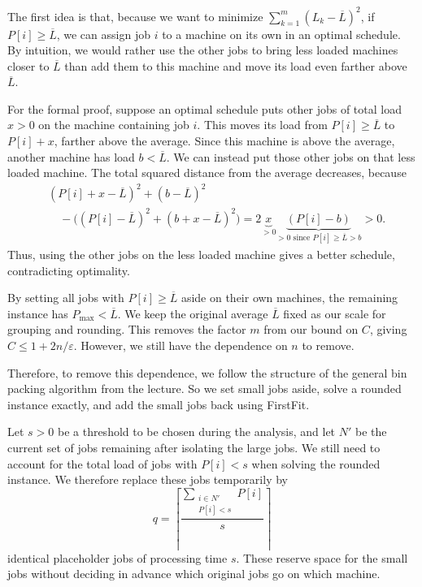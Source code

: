 \documentclass[12pt,a4paper]{article}
\theoremstyle{definition}
\theoremstyle{plain}
\begin{document}
The first idea is that, because we want to minimize
$\sum_{k=1}^{m}(L_k-\overline{L})^2$,
if $P[i]\geq\overline{L}$, we can assign
job $i$ to a machine on its own in an optimal schedule. By intuition, we
would rather use the other jobs to bring less loaded machines closer to
$\overline{L}$ than add them to this machine and move its load even
farther above $\overline{L}$.

For the formal proof, suppose an optimal schedule puts other jobs of
total load $x>0$ on the machine containing job $i$. This moves its load
from $P[i]\geq\overline{L}$ to $P[i]+x$, farther above the average.
Since this machine is above the average, another machine has load
$b<\overline{L}$. We can instead put those other jobs on that less loaded
machine. The total squared distance from the average decreases, because
\[
\begin{aligned}
&(P[i]+x-\overline{L})^2+(b-\overline{L})^2\\
&\quad-\bigl((P[i]-\overline{L})^2+(b+x-\overline{L})^2\bigr)
=2\underbrace{x}_{>0}\underbrace{(P[i]-b)}_{>0\text{ since }P[i]\geq\overline{L}>b}>0.
\end{aligned}
\]
Thus, using the other jobs on the less loaded machine gives a better
schedule, contradicting optimality.

By setting all jobs with $P[i]\geq\overline{L}$ aside on their own machines,
the remaining instance has $P_{\max}<\overline{L}$. We keep the original
average $\overline{L}$ fixed as our scale for grouping and rounding.
This removes the factor $m$ from our bound on
$C$, giving $C\leq1+2n/\varepsilon$. However, we still have the dependence
on $n$ to remove.

Therefore, to remove this dependence, we follow the structure of the
general bin packing algorithm from the lecture. So we set small jobs aside,
solve a rounded instance exactly, and add the small jobs back using
FirstFit.

Let $s>0$ be a threshold to be chosen during the analysis, and let $N'$ be the current set of jobs
remaining after isolating the large jobs. We still need to account for
the total load of jobs with $P[i]<s$ when solving the rounded instance.
We therefore replace these jobs temporarily by
\[
q=\left\lceil\frac{\sum_{\substack{i\in N'\\P[i]<s}}P[i]}{s}\right\rceil
\]
identical placeholder jobs of processing time $s$.
These reserve space for the small jobs without deciding in advance which
original jobs go on which machine.
\end{document}
